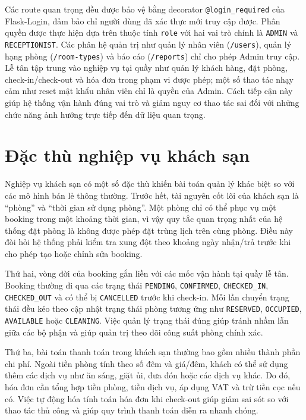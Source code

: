 \documentclass[13pt,a4paper]{extreport}
\begin{document}
Các route quan trọng đều được bảo vệ bằng decorator \texttt{@login\_required} của Flask-Login, đảm bảo chỉ người dùng đã xác thực mới truy cập được. Phân quyền được thực hiện dựa trên thuộc tính \texttt{role} với hai vai trò chính là \texttt{ADMIN} và \texttt{RECEPTIONIST}. Các phân hệ quản trị như quản lý nhân viên (\texttt{/users}), quản lý hạng phòng (\texttt{/room-types}) và báo cáo (\texttt{/reports}) chỉ cho phép Admin truy cập. Lễ tân tập trung vào nghiệp vụ tại quầy như quản lý khách hàng, đặt phòng, check-in/check-out và hóa đơn trong phạm vi được phép; một số thao tác nhạy cảm như reset mật khẩu nhân viên chỉ là quyền của Admin. Cách tiếp cận này giúp hệ thống vận hành đúng vai trò và giảm nguy cơ thao tác sai đối với những chức năng ảnh hưởng trực tiếp đến dữ liệu quan trọng.

\section{Đặc thù nghiệp vụ khách sạn}

Nghiệp vụ khách sạn có một số đặc thù khiến bài toán quản lý khác biệt so với các mô hình bán lẻ thông thường. Trước hết, tài nguyên cốt lõi của khách sạn là ``phòng'' và ``thời gian sử dụng phòng''. Một phòng chỉ có thể phục vụ một booking trong một khoảng thời gian, vì vậy quy tắc quan trọng nhất của hệ thống đặt phòng là không được phép đặt trùng lịch trên cùng phòng. Điều này đòi hỏi hệ thống phải kiểm tra xung đột theo khoảng ngày nhận/trả trước khi cho phép tạo hoặc chỉnh sửa booking.

Thứ hai, vòng đời của booking gắn liền với các mốc vận hành tại quầy lễ tân. Booking thường đi qua các trạng thái \texttt{PENDING}, \texttt{CONFIRMED}, \texttt{CHECKED\_IN}, \texttt{CHECKED\_OUT} và có thể bị \texttt{CANCELLED} trước khi check-in. Mỗi lần chuyển trạng thái đều kéo theo cập nhật trạng thái phòng tương ứng như \texttt{RESERVED}, \texttt{OCCUPIED}, \texttt{AVAILABLE} hoặc \texttt{CLEANING}. Việc quản lý trạng thái đúng giúp tránh nhầm lẫn giữa các bộ phận và giúp quản trị theo dõi công suất phòng chính xác.

Thứ ba, bài toán thanh toán trong khách sạn thường bao gồm nhiều thành phần chi phí. Ngoài tiền phòng tính theo số đêm và giá/đêm, khách có thể sử dụng thêm các dịch vụ như ăn sáng, giặt ủi, đưa đón hoặc các dịch vụ khác. Do đó, hóa đơn cần tổng hợp tiền phòng, tiền dịch vụ, áp dụng VAT và trừ tiền cọc nếu có. Việc tự động hóa tính toán hóa đơn khi check-out giúp giảm sai sót so với thao tác thủ công và giúp quy trình thanh toán diễn ra nhanh chóng.
\end{document}
